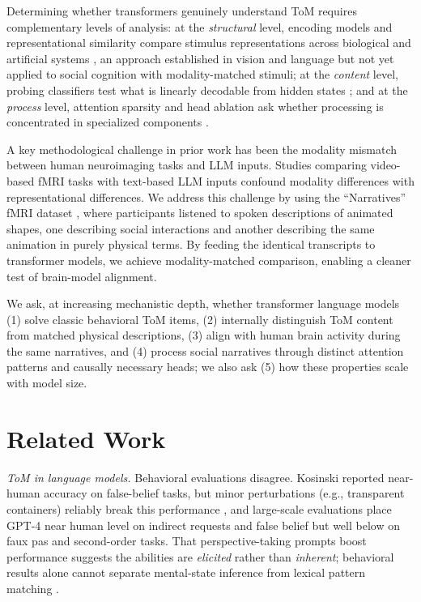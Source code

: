 \documentclass[conference]{IEEEtran}
\begin{document}
Determining whether transformers genuinely understand ToM requires complementary levels of analysis: at the \textit{structural} level, encoding models and representational similarity compare stimulus representations across biological and artificial systems \cite{kriegeskorte2008representational}, an approach established in vision \cite{khaligh2014deep} and language \cite{schrimpf2021neural, caucheteux2022brains, goldstein2022shared} but not yet applied to social cognition with modality-matched stimuli; at the \textit{content} level, probing classifiers test what is linearly decodable from hidden states \cite{elhage2021mathematical}; and at the \textit{process} level, attention sparsity and head ablation ask whether processing is concentrated in specialized components \cite{wang2022interpretability, conmy2023towards}.

A key methodological challenge in prior work has been the modality mismatch between human neuroimaging tasks and LLM inputs. Studies comparing video-based fMRI tasks with text-based LLM inputs confound modality differences with representational differences. We address this challenge by using the ``Narratives'' fMRI dataset \cite{nastase2021narratives}, where participants listened to spoken descriptions of animated shapes, one describing social interactions and another describing the same animation in purely physical terms. By feeding the identical transcripts to transformer models, we achieve modality-matched comparison, enabling a cleaner test of brain-model alignment.

We ask, at increasing mechanistic depth, whether transformer language models (1) solve classic behavioral ToM items, (2) internally distinguish ToM content from matched physical descriptions, (3) align with human brain activity during the same narratives, and (4) process social narratives through distinct attention patterns and causally necessary heads; we also ask (5) how these properties scale with model size.

\section{Related Work}

\textit{ToM in language models.} Behavioral evaluations disagree. Kosinski \cite{kosinski2024evaluating} reported near-human accuracy on false-belief tasks, but minor perturbations (e.g., transparent containers) reliably break this performance \cite{ullman2023large}, and large-scale evaluations \cite{strachan2024testing, chen2024tombench} place GPT-4 near human level on indirect requests and false belief but well below on faux pas and second-order tasks. That perspective-taking prompts boost performance \cite{wilf2024think} suggests the abilities are \emph{elicited} rather than \emph{inherent}; behavioral results alone cannot separate mental-state inference from lexical pattern matching \cite{sap2022neural, marcus2023large}.
\end{document}
